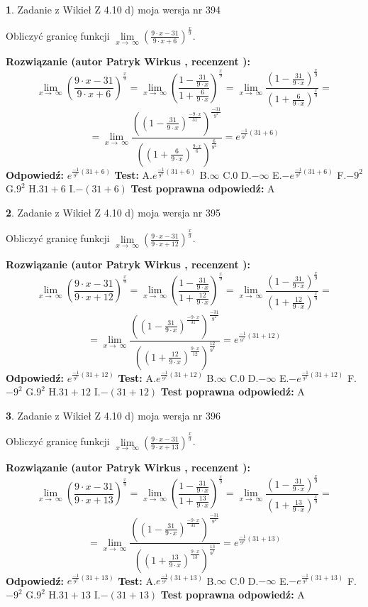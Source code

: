 \documentclass[12pt, a4paper]{article}
\theoremstyle{definition} %
\newtheorem{zad}{}
\newcommand{\zadStart}[1]{\begin{zad}#1\newline}
\newcommand{\zadStop}{\end{zad}}
\newcommand{\rozwStart}[2]{\noindent \textbf{Rozwiązanie (autor #1 , recenzent #2): }\newline}
\newcommand{\rozwStop}{\newline}
\newcommand{\odpStart}{\noindent \textbf{Odpowiedź:}\newline}
\newcommand{\odpStop}{\newline}
\newcommand{\testStart}{\noindent \textbf{Test:}\newline}
\newcommand{\testStop}{\newline}
\newcommand{\kluczStart}{\noindent \textbf{Test poprawna odpowiedź:}\newline}
\newcommand{\kluczStop}{\newline}
\begin{document}
\zadStart{Zadanie z Wikieł Z 4.10 d) moja wersja nr 394}


Obliczyć granicę funkcji  $\lim\limits_{x\to\ \infty}(\frac{9\cdot x-31}{9\cdot x+6})^{\frac{x}{9}}$.
\zadStop
\rozwStart{Patryk Wirkus}{}
$$\lim\limits_{x\to\ \infty}(\frac{9\cdot x-31}{9\cdot x+6})^{\frac{x}{9}} = \lim\limits_{x\to\ \infty}(\frac{1-\frac{31}{9\cdot x}}{1+\frac{6}{9\cdot x}})^{\frac{x}{9}}=\lim\limits_{x\to\ \infty}\frac{(1-\frac{31}{9\cdot x})^{\frac{x}{9}}}{(1+\frac{6}{9\cdot x})^{\frac{x}{9}}}=$$
$$=\lim\limits_{x\to\ \infty}\frac{((1-\frac{31}{9\cdot x})^{\frac{-9\cdot x}{31}})^{\frac{-31}{9^{2}}}}{((1+\frac{6}{9\cdot x})^{\frac{9\cdot x}{6}})^{\frac{6}{9^{2}}}}=e^{\frac{-1}{9^{2}}(31+6)}$$
\rozwStop
\odpStart
$e^{\frac{-1}{9^{2}}(31+6)}$
\odpStop
\testStart
A.$e^{\frac{-1}{9^{2}}(31+6)}$ B.$\infty$ C.$0$ D.$-\infty$ E.$-e^{\frac{-1}{9^{2}}(31+6)}$
F.$-9^{2}$ G.$9^{2}$
H.$31+6$
I.$-(31+6)$
\testStop
\kluczStart
A
\kluczStop



\zadStart{Zadanie z Wikieł Z 4.10 d) moja wersja nr 395}


Obliczyć granicę funkcji  $\lim\limits_{x\to\ \infty}(\frac{9\cdot x-31}{9\cdot x+12})^{\frac{x}{9}}$.
\zadStop
\rozwStart{Patryk Wirkus}{}
$$\lim\limits_{x\to\ \infty}(\frac{9\cdot x-31}{9\cdot x+12})^{\frac{x}{9}} = \lim\limits_{x\to\ \infty}(\frac{1-\frac{31}{9\cdot x}}{1+\frac{12}{9\cdot x}})^{\frac{x}{9}}=\lim\limits_{x\to\ \infty}\frac{(1-\frac{31}{9\cdot x})^{\frac{x}{9}}}{(1+\frac{12}{9\cdot x})^{\frac{x}{9}}}=$$
$$=\lim\limits_{x\to\ \infty}\frac{((1-\frac{31}{9\cdot x})^{\frac{-9\cdot x}{31}})^{\frac{-31}{9^{2}}}}{((1+\frac{12}{9\cdot x})^{\frac{9\cdot x}{12}})^{\frac{12}{9^{2}}}}=e^{\frac{-1}{9^{2}}(31+12)}$$
\rozwStop
\odpStart
$e^{\frac{-1}{9^{2}}(31+12)}$
\odpStop
\testStart
A.$e^{\frac{-1}{9^{2}}(31+12)}$ B.$\infty$ C.$0$ D.$-\infty$ E.$-e^{\frac{-1}{9^{2}}(31+12)}$
F.$-9^{2}$ G.$9^{2}$
H.$31+12$
I.$-(31+12)$
\testStop
\kluczStart
A
\kluczStop



\zadStart{Zadanie z Wikieł Z 4.10 d) moja wersja nr 396}


Obliczyć granicę funkcji  $\lim\limits_{x\to\ \infty}(\frac{9\cdot x-31}{9\cdot x+13})^{\frac{x}{9}}$.
\zadStop
\rozwStart{Patryk Wirkus}{}
$$\lim\limits_{x\to\ \infty}(\frac{9\cdot x-31}{9\cdot x+13})^{\frac{x}{9}} = \lim\limits_{x\to\ \infty}(\frac{1-\frac{31}{9\cdot x}}{1+\frac{13}{9\cdot x}})^{\frac{x}{9}}=\lim\limits_{x\to\ \infty}\frac{(1-\frac{31}{9\cdot x})^{\frac{x}{9}}}{(1+\frac{13}{9\cdot x})^{\frac{x}{9}}}=$$
$$=\lim\limits_{x\to\ \infty}\frac{((1-\frac{31}{9\cdot x})^{\frac{-9\cdot x}{31}})^{\frac{-31}{9^{2}}}}{((1+\frac{13}{9\cdot x})^{\frac{9\cdot x}{13}})^{\frac{13}{9^{2}}}}=e^{\frac{-1}{9^{2}}(31+13)}$$
\rozwStop
\odpStart
$e^{\frac{-1}{9^{2}}(31+13)}$
\odpStop
\testStart
A.$e^{\frac{-1}{9^{2}}(31+13)}$ B.$\infty$ C.$0$ D.$-\infty$ E.$-e^{\frac{-1}{9^{2}}(31+13)}$
F.$-9^{2}$ G.$9^{2}$
H.$31+13$
I.$-(31+13)$
\testStop
\kluczStart
A
\kluczStop
\end{document}
